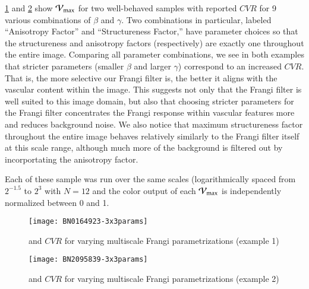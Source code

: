 \cref{fig:compare_parameters_3by3_example1} and \cref{fig:compare_parameters_3by3_example2} show $\mathcal{V}_{\max}$ for two well-behaved samples with reported $CVR$ for 9 various combinations of $\beta$ and $\gamma$. Two combinations in particular, labeled ``Anisotropy Factor'' and ``Structureness Factor,'' have parameter choices so that the structureness and anisotropy factors (respectively) are exactly one throughout the entire image. Comparing all parameter combinations, we see in both examples that stricter parameters (smaller $\beta$ and larger $\gamma$) correspond to an increased $CVR$. That is, the more selective our Frangi filter is, the better it aligns with the vascular content within the image. This suggests not only that the Frangi filter is well suited to this image domain, but also that choosing stricter parameters for the Frangi filter concentrates the Frangi response within vascular features more and reduces background noise. We also notice that maximum structureness factor throughout the entire image behaves relatively similarly to the Frangi filter itself at this scale range, although much more of the background is filtered out by incorportating the anisotropy factor.

Each of these sample was run over the same scales (logarithmically spaced from $2^{-1.5}$ to $2^{3}$ with $N=12$ and the color output of each $\mathcal{V}_{\max}$ is independently normalized between 0 and 1.




\begin{figure}[p]\centering
		\texttt{[image: BN0164923-3x3params]}
	\caption{\Vmax  and $CVR$ for varying multiscale Frangi parametrizations (example 1)}
	\label{fig:compare_parameters_3by3_example1}
\end{figure}

\begin{figure}[p]\centering
	\texttt{[image: BN2095839-3x3params]}
	\caption{\Vmax  and $CVR$ for varying multiscale Frangi parametrizations (example 2)}
	\label{fig:compare_parameters_3by3_example2}
\end{figure}

